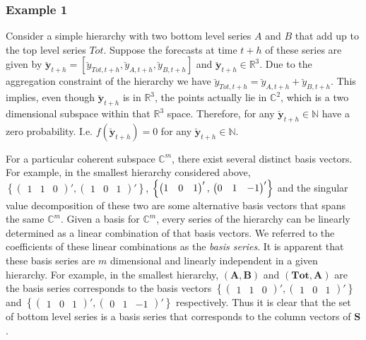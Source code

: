 \documentclass[a4paper, 11pt]{article}
\begin{document}
\subsubsection*{Example 1}

Consider a simple hierarchy with two bottom level series $A$ and $B$ that add up to the top level series $Tot$. Suppose the forecasts at time $t+h$ of these series are given by $\bm{\breve{y}}_{t+h} = [\breve{y}_{Tot,t+h},\breve{y}_{A,t+h}, \breve{y}_{B,t+h}]$ and $\bm{\breve{y}}_{t+h} \in \bm{\mathbb{R}}^3$. Due to the aggregation constraint of the hierarchy we have $\breve{y}_{Tot,t+h}=\breve{y}_{A,t+h}+\breve{y}_{B,t+h}$. This implies, even though  $\bm{\breve{y}}_{t+h}$ is in $\bm{\mathbb{R}}^3$, the points actually lie in $\bm{\mathbb{C}}^2$, which is a two dimensional subspace within that $\bm{\mathbb{R}}^3$ space. Therefore, for any $\bm{\breve{y}}_{t+h} \in \bm{\mathbb{N}}$ have a zero probability. I.e. $f(\bm{\breve{y}}_{t+h})=0$ for any $\bm{\breve{y}}_{t+h} \in \bm{\mathbb{N}}$.

For a particular coherent subspace $\bm{\mathbb{C}}^m$, there exist several distinct basis vectors. For example, in the smallest hierarchy considered above, $\left\{\begin{pmatrix} 1&1&0 \end{pmatrix}', \begin{pmatrix} 1&0&1 \end{pmatrix}'\right\}$, $\left\{\begin{pmatrix} 1&0&1 \end{pmatrix}',\\ \begin{pmatrix}
0&1&-1 \end{pmatrix}'\right\}$ and the singular value decomposition of these two are some alternative basis vectors that spans the same $\bm{\mathbb{C}}^m$. Given a basis for $\bm{\mathbb{C}}^m$, every series of the hierarchy can be linearly determined as a linear combination of that basis vectors. We referred to the coefficients of these linear combinations as the \textit{basis series}. It is apparent that these basis series are $m$ dimensional and linearly independent in a given hierarchy. For example, in the smallest hierarchy, $(\bm{A,B})$ and $(\bm{Tot,A})$ are the basis series corresponds to the basis vectors $\left\{\begin{pmatrix} 1&1&0 \end{pmatrix}', \begin{pmatrix} 1&0&1 \end{pmatrix}'\right\}$ and $\left\{\begin{pmatrix} 1&0&1 \end{pmatrix}', \begin{pmatrix}
0&1&-1 \end{pmatrix}'\right\}$ respectively. Thus it is clear that the set of bottom level series is a basis series that corresponds to the column vectors of $\bm{S}$. 
\end{document}
